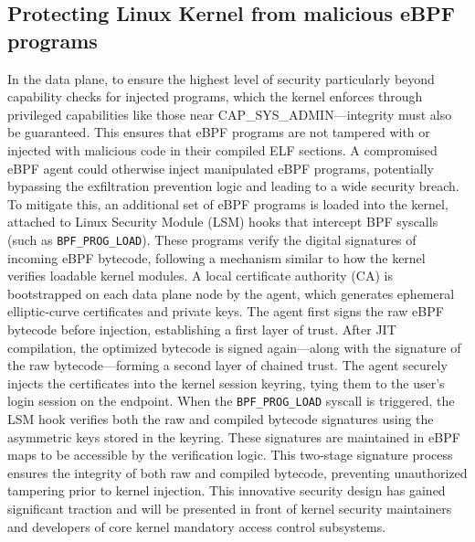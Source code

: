 \documentclass [11pt, proquest] {uwthesis}[2020/02/24]
\begin{document}
\subsection{Protecting Linux Kernel from malicious eBPF programs}
In the data plane, to ensure the highest level of security particularly beyond capability checks for injected programs, which the kernel enforces through privileged capabilities like those near CAP\_SYS\_ADMIN—integrity must also be guaranteed. This ensures that eBPF programs are not tampered with or injected with malicious code in their compiled ELF sections. A compromised eBPF agent could otherwise inject manipulated eBPF programs, potentially bypassing the exfiltration prevention logic and leading to a wide security breach. To mitigate this, an additional set of eBPF programs is loaded into the kernel, attached to Linux Security Module (LSM) hooks that intercept BPF syscalls (such as \texttt{BPF\_PROG\_LOAD}). These programs verify the digital signatures of incoming eBPF bytecode, following a mechanism similar to how the kernel verifies loadable kernel modules. A local certificate authority (CA) is bootstrapped on each data plane node by the agent, which generates ephemeral elliptic-curve certificates and private keys. The agent first signs the raw eBPF bytecode before injection, establishing a first layer of trust. After JIT compilation, the optimized bytecode is signed again—along with the signature of the raw bytecode—forming a second layer of chained trust. The agent securely injects the certificates into the kernel session keyring, tying them to the user’s login session on the endpoint. When the \texttt{BPF\_PROG\_LOAD} syscall is triggered, the LSM hook verifies both the raw and compiled bytecode signatures using the asymmetric keys stored in the keyring. These signatures are maintained in eBPF maps to be accessible by the verification logic. This two-stage signature process ensures the integrity of both raw and compiled bytecode, preventing unauthorized tampering prior to kernel injection. This innovative security design has gained significant traction and will be presented in front of kernel security maintainers and developers of core kernel mandatory access control subsystems.
\end{document}
